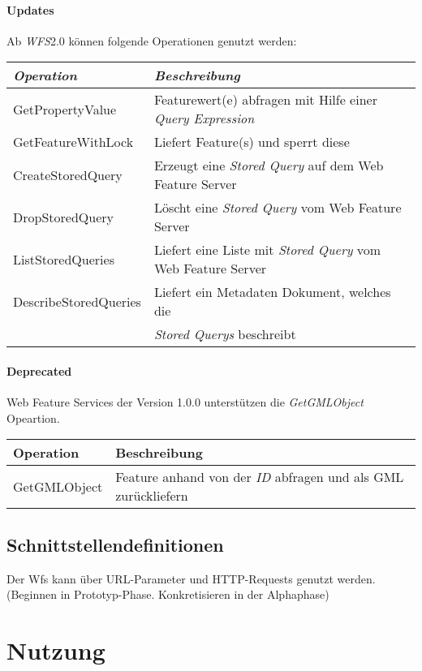 \documentclass[12pt]{article}
\begin{document}
\paragraph{Updates}
Ab \emph{WFS}2.0 können folgende Operationen genutzt werden:\\
\begin{tabular}{ll}
\emph{Operation} & \emph{Beschreibung} \\
\hline 
GetPropertyValue	 & Featurewert(e) abfragen mit Hilfe einer \emph{Query Expression}\\
\hline 
GetFeatureWithLock & Liefert Feature(s) und sperrt diese\\
\hline 
CreateStoredQuery	& Erzeugt eine \emph{Stored Query} auf dem Web Feature Server\\
\hline 
DropStoredQuery	& Löscht eine \emph{Stored Query} vom Web Feature Server\\
\hline 
ListStoredQueries&	Liefert eine Liste mit \emph{Stored Query} vom Web Feature Server\\
\hline 
DescribeStoredQueries	& Liefert ein Metadaten Dokument, welches die \\ & \emph{Stored Querys} beschreibt\\
\hline 
\end{tabular}
\paragraph{Deprecated} Web Feature Services der Version 1.0.0 unterstützen die \emph{GetGMLObject} Opeartion.
\\

\begin{tabular}{ll}
Operation & Beschreibung\\
\hline
GetGMLObject & Feature anhand von der \emph{ID} abfragen und als GML zurückliefern
\end{tabular}



\subsection{Schnittstellendefinitionen}
Der Wfs kann \"uber URL-Parameter und HTTP-Requests genutzt werden.\\

(Beginnen in Prototyp-Phase. Konkretisieren in der Alphaphase)

\section{Nutzung}
\end{document}
